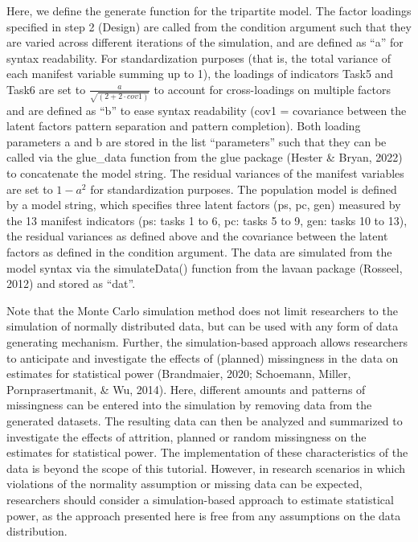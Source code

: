 \documentclass[
  man,floatsintext]{apa6}
\begin{document}
Here, we define the generate function for the tripartite model. The factor loadings specified in step 2 (Design) are called from the condition argument such that they are varied across different iterations of the simulation, and are defined as ``a'' for syntax readability. For standardization purposes (that is, the total variance of each manifest variable summing up to 1), the loadings of indicators Task5 and Task6 are set to \(\frac {a}{\sqrt{(2+2 \cdot cov1)}}\) to account for cross-loadings on multiple factors and are defined as ``b'' to ease syntax readability (cov1 = covariance between the latent factors pattern separation and pattern completion). Both loading parameters a and b are stored in the list ``parameters'' such that they can be called via the glue\_data function from the glue package (Hester \& Bryan, 2022) to concatenate the model string. The residual variances of the manifest variables are set to \(1-a^2\) for standardization purposes. The population model is defined by a model string, which specifies three latent factors (ps, pc, gen) measured by the 13 manifest indicators (ps: tasks 1 to 6, pc: tasks 5 to 9, gen: tasks 10 to 13), the residual variances as defined above and the covariance between the latent factors as defined in the condition argument. The data are simulated from the model syntax via the simulateData() function from the lavaan package (Rosseel, 2012) and stored as ``dat''.

Note that the Monte Carlo simulation method does not limit researchers to the simulation of normally distributed data, but can be used with any form of data generating mechanism. Further, the simulation-based approach allows researchers to anticipate and investigate the effects of (planned) missingness in the data on estimates for statistical power (Brandmaier, 2020; Schoemann, Miller, Pornprasertmanit, \& Wu, 2014). Here, different amounts and patterns of missingness can be entered into the simulation by removing data from the generated datasets. The resulting data can then be analyzed and summarized to investigate the effects of attrition, planned or random missingness on the estimates for statistical power. The implementation of these characteristics of the data is beyond the scope of this tutorial. However, in research scenarios in which violations of the normality assumption or missing data can be expected, researchers should consider a simulation-based approach to estimate statistical power, as the approach presented here is free from any assumptions on the data distribution.
\end{document}

